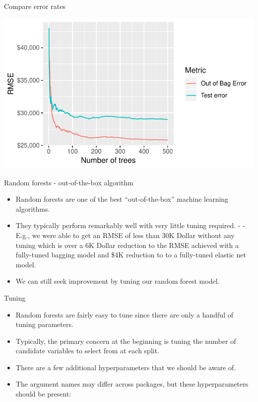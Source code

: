 \documentclass[
  10pt,
  ignorenonframetext,
]{beamer}
\providecommand{\tightlist}{%
  \setlength{\itemsep}{0pt}\setlength{\parskip}{0pt}}
\begin{document}
\begin{frame}{Compare error rates}
\protect\hypertarget{compare-error-rates}{}

\includegraphics{c2_random_forests_files/figure-beamer/unnamed-chunk-10-1.pdf}

\end{frame}

\begin{frame}{Random forests - out-of-the-box algorithm}
\protect\hypertarget{random-forests---out-of-the-box-algorithm}{}

\begin{itemize}
\tightlist
\item
  Random forests are one of the best ``out-of-the-box'' machine learning
  algorithms.
\item
  They typically perform remarkably well with very little tuning
  required. - - E.g., we were able to get an RMSE of less than 30K
  Dollar without any tuning which is over a 6K Dollar reduction to the
  RMSE achieved with a fully-tuned bagging model and \$4K reduction to
  to a fully-tuned elastic net model.
\item
  We can still seek improvement by tuning our random forest model.
\end{itemize}

\end{frame}

\begin{frame}{Tuning}
\protect\hypertarget{tuning}{}

\begin{itemize}
\tightlist
\item
  Random forests are fairly easy to tune since there are only a handful
  of tuning parameters.
\item
  Typically, the primary concern at the beginning is tuning the number
  of candidate variables to select from at each split.
\item
  There are a few additional hyperparameters that we should be aware of.
\item
  The argument names may differ across packages, but these
  hyperparameters should be present:
\end{itemize}

\end{frame}
\end{document}
